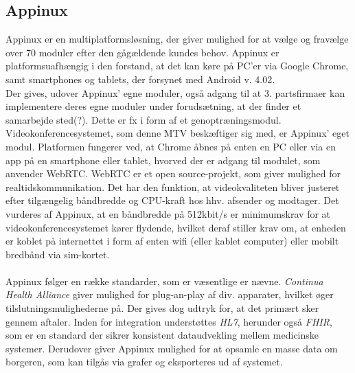 \subsection{Appinux}
Appinux er en multiplatformsløsning, der giver mulighed for at vælge og fravælge over 70 moduler efter den gågældende kundes behov. Appinux er platformsuafhængig i den forstand, at det kan køre på PC'er via Google Chrome, samt  smartphones og tablets, der forsynet med Android v. 4.02.\\Der gives, udover Appinux' egne moduler, også adgang til at 3. partsfirmaer kan implementere deres egne moduler under forudsætning, at der finder et samarbejde sted(?). Dette er fx i form af et genoptræningsmodul.\\Videokonferencesystemet, som denne MTV beskæftiger sig med, er Appinux' eget modul. Platformen fungerer ved, at Chrome åbnes på enten en PC eller via en app på en smartphone eller tablet, hvorved der er adgang til modulet, som anvender WebRTC. WebRTC er et open source-projekt, som giver mulighed for realtidskommunikation. Det har den funktion, at videokvaliteten bliver justeret efter tilgængelig båndbredde og CPU-kraft hos hhv. afsender og modtager. Det vurderes af Appinux, at en båndbredde på 512kbit/s er minimumskrav for at videokonferencesystemet kører flydende, hvilket deraf stiller krav om, at enheden er koblet på internettet i form af enten wifi (eller kablet computer) eller mobilt bredbånd via sim-kortet.
\\ \\
Appinux følger en række standarder, som er væsentlige   er nævne. \textit{Continua Health Alliance} giver mulighed for plug-an-play af div. apparater, hvilket øger tilslutningsmulighederne på. Der gives dog udtryk for, at det primært sker gennem aftaler. Inden for integration understøttes \textit{HL7}, herunder også \textit{FHIR}, som er en standard der sikrer konsistent dataudvekling mellem medicinske systemer. Derudover giver Appinux mulighed for at opsamle en masse data om borgeren, som kan tilgås via grafer og eksporteres ud af systemet.


